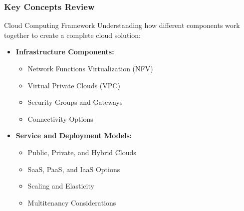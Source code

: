 \documentclass{beamer}
\begin{document}
\begin{frame}
    \frametitle{Key Concepts Review}
    
    \begin{block}{Cloud Computing Framework}
        Understanding how different components work together to create a complete cloud solution:
    \end{block}
    
    \begin{itemize}
        \item \textbf{Infrastructure Components:}
        \begin{itemize}
            \item Network Functions Virtualization (NFV)
            \item Virtual Private Clouds (VPC)
            \item Security Groups and Gateways
            \item Connectivity Options
        \end{itemize}
        
        \item \textbf{Service and Deployment Models:}
        \begin{itemize}
            \item Public, Private, and Hybrid Clouds
            \item SaaS, PaaS, and IaaS Options
            \item Scaling and Elasticity
            \item Multitenancy Considerations
        \end{itemize}
    \end{itemize}
\end{frame}
\end{document}

